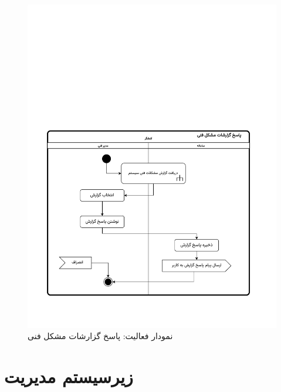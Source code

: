 \begin{figure}[ht!]
	\centering
	\includegraphics[scale=0.8, page=1]{figs/OOD-activity-techrepans.pdf}
	\caption{نمودار فعالیت: پاسخ گزارشات مشکل فنی}
\end{figure}
\FloatBarrier
\newpage








\section{زیرسیستم مدیریت}


